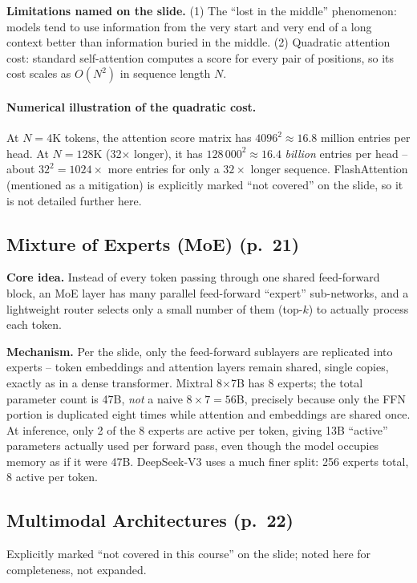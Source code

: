 \documentclass[11pt]{article}
\begin{document}
\textbf{Limitations named on the slide.} (1) The ``lost in the middle'' phenomenon: models tend to use information from the very start and very end of a long context better than information buried in the middle. (2) Quadratic attention cost: standard self-attention computes a score for every pair of positions, so its cost scales as $O(N^2)$ in sequence length $N$.

\paragraph{Numerical illustration of the quadratic cost.} At $N=4$K tokens, the attention score matrix has $4096^2\approx16.8$ million entries per head. At $N=128$K (32$\times$ longer), it has $128\,000^2\approx16.4$ \emph{billion} entries per head -- about $32^2=1024\times$ more entries for only a $32\times$ longer sequence. FlashAttention (mentioned as a mitigation) is explicitly marked ``not covered'' on the slide, so it is not detailed further here.

\subsection{Mixture of Experts (MoE) (p.\ 21)}

\textbf{Core idea.} Instead of every token passing through one shared feed-forward block, an MoE layer has many parallel feed-forward ``expert'' sub-networks, and a lightweight router selects only a small number of them (top-$k$) to actually process each token.

\textbf{Mechanism.} Per the slide, only the feed-forward sublayers are replicated into experts -- token embeddings and attention layers remain shared, single copies, exactly as in a dense transformer. Mixtral 8$\times$7B has 8 experts; the total parameter count is 47B, \emph{not} a naive $8\times7=56$B, precisely because only the FFN portion is duplicated eight times while attention and embeddings are shared once. At inference, only 2 of the 8 experts are active per token, giving 13B ``active'' parameters actually used per forward pass, even though the model occupies memory as if it were 47B. DeepSeek-V3 uses a much finer split: 256 experts total, 8 active per token.

\subsection{Multimodal Architectures (p.\ 22)}

Explicitly marked ``not covered in this course'' on the slide; noted here for completeness, not expanded.
\end{document}
